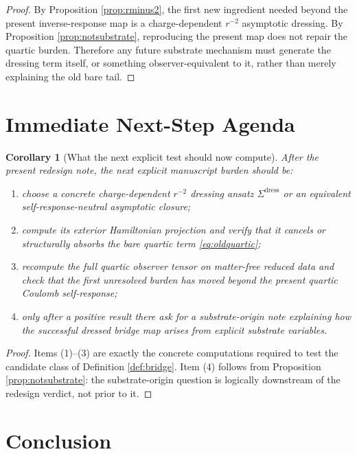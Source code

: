 \documentclass[11pt]{article}
\newcommand{\SigmaDress}{\Sigma^{\mathrm{dress}}}
\newtheorem{corollary}{Corollary}
\begin{document}
\begin{proof}
By Proposition \ref{prop:rminus2}, the first new ingredient needed beyond the present inverse-response map is a charge-dependent \(r^{-2}\) asymptotic dressing. By Proposition \ref{prop:notsubstrate}, reproducing the present map does not repair the quartic burden. Therefore any future substrate mechanism must generate the dressing term itself, or something observer-equivalent to it, rather than merely explaining the old bare tail.
\end{proof}

\section{Immediate Next-Step Agenda}

\begin{corollary}[What the next explicit test should now compute]
\label{cor:next}
After the present redesign note, the next explicit manuscript burden should be:
\begin{enumerate}
    \item choose a concrete charge-dependent \(r^{-2}\) dressing ansatz \(\SigmaDress\) or an equivalent self-response-neutral asymptotic closure;
    \item compute its exterior Hamiltonian projection and verify that it cancels or structurally absorbs the bare quartic term \eqref{eq:oldquartic};
    \item recompute the full quartic observer tensor on matter-free reduced data and check that the first unresolved burden has moved beyond the present quartic Coulomb self-response;
    \item only after a positive result there ask for a substrate-origin note explaining how the successful dressed bridge map arises from explicit substrate variables.
\end{enumerate}
\end{corollary}

\begin{proof}
Items (1)--(3) are exactly the concrete computations required to test the candidate class of Definition \ref{def:bridge}. Item (4) follows from Proposition \ref{prop:notsubstrate}: the substrate-origin question is logically downstream of the redesign verdict, not prior to it.
\end{proof}

\section{Conclusion}
\end{document}
